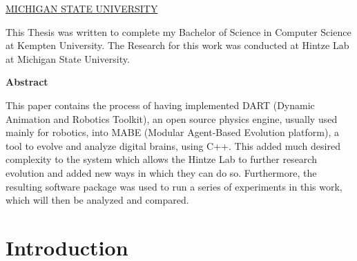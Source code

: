 \documentclass[12pt,oneside,listof=totoc,paper=a4,headings=small]{scrbook}
\begin{document}
\newpage
\vspace*{0.5cm}
\begin{center}
{\Large \color{OliveGreen} \underline {MICHIGAN STATE UNIVERSITY}}
\end{center}
\begin{center}
 This Thesis was written to complete my Bachelor of Science in Computer Science at Kempten University. The Research for this work was conducted at Hintze Lab at Michigan State University.
\end{center}

\newpage

\vspace*{1cm}

\begin{center}
    \textbf{Abstract}
\end{center}

\vspace*{1cm}

\noindent
This paper contains the process of having implemented DART (Dynamic Animation and Robotics Toolkit), an open source physics engine, usually used mainly for robotics, into MABE (Modular Agent-Based Evolution platform), a tool to evolve and analyze digital brains, using C++. This added much desired complexity to the system which allows the Hintze Lab to further research evolution and added new ways in which they can do so. Furthermore, the resulting software package was used to run a series of experiments in this work, which will then be analyzed and compared.


\tableofcontents
\listoffigures
\lstlistoflistings
\listoftables

\clearpage
\mainmatter
\setcounter{page}{1}

\chapter{Introduction}
\end{document}
